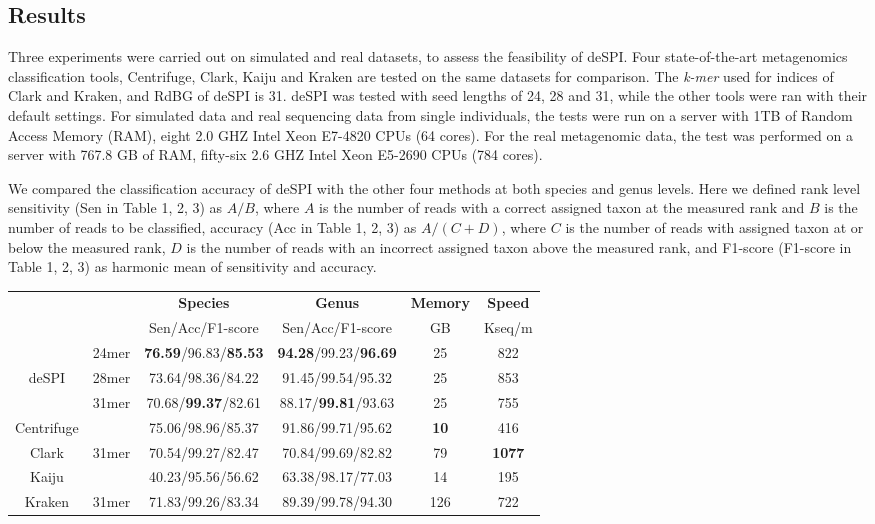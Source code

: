\documentclass[a0,portrait, svgnames]{a0poster}
\begin{document}
\begin{multicols}{2}
\section*{Results}
Three experiments were carried out on simulated and real datasets, to assess the feasibility of deSPI. Four state-of-the-art metagenomics classification tools, Centrifuge, Clark, Kaiju and Kraken are tested on the same datasets for comparison. The \textit{k-mer} used for indices of Clark and Kraken, and RdBG of deSPI is 31. deSPI was tested with seed lengths of 24, 28 and 31, while the other tools were ran with their default settings. For simulated data and real sequencing data from single individuals, the tests were run on a server with 1TB of Random Access Memory (RAM), eight 2.0 GHZ Intel Xeon E7-4820 CPUs (64 cores). For the real metagenomic data, the test was performed on a server with 767.8 GB of RAM, fifty-six 2.6 GHZ Intel Xeon E5-2690 CPUs (784 cores). 

We compared the classification accuracy of deSPI with the other four methods at both species and genus levels. Here we defined rank level sensitivity (Sen in Table 1, 2, 3) as $A/B$, where $A$ is the number of reads with a correct assigned taxon at the measured rank and $B$ is the number of reads to be classified, accuracy (Acc in Table 1, 2, 3) as $A/(C+D)$, where $C$ is the number of reads with assigned taxon at or below the measured rank, $D$ is the number of reads with an incorrect assigned taxon above the measured rank, and F1-score (F1-score in Table 1, 2, 3) as harmonic mean of sensitivity and accuracy.  

\begin{center}\vspace{1cm}
\small
\begin{tabular}{cccccc}
\toprule
& & \textbf{Species} & \textbf{Genus} & \textbf{Memory} & \textbf{Speed} \\
\cline{3-6}
& & Sen/Acc/F1-score & Sen/Acc/F1-score  & GB & Kseq/m \\
\midrule
& 24mer & \textbf{76.59}/96.83/\textbf{85.53} & \textbf{94.28}/99.23/\textbf{96.69} & 25 & 822 \\ 
deSPI & 28mer & 73.64/98.36/84.22 & 91.45/99.54/95.32 & 25 & 853 \\
& 31mer & 70.68/\textbf{99.37}/82.61 & 88.17/\textbf{99.81}/93.63 & 25 & 755 \\
Centrifuge & & 75.06/98.96/85.37 & 91.86/99.71/95.62 & \textbf{10} & 416 \\
Clark & 31mer & 70.54/99.27/82.47 & 70.84/99.69/82.82 & 79 & \textbf{1077} \\
Kaiju & & 40.23/95.56/56.62 & 63.38/98.17/77.03 & 14 & 195 \\
Kraken & 31mer & 71.83/99.26/83.34 & 89.39/99.78/94.30 & 126 & 722 \\
\bottomrule
\end{tabular}
\end{center}\vspace{1cm}


\end{multicols}
\end{document}
